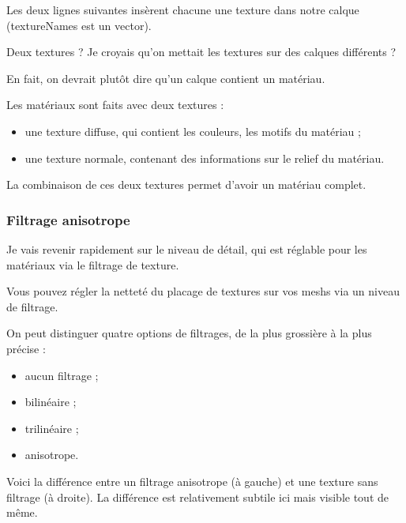 \documentclass[10pt,a4paper]{report}
\begin{document}
Les deux lignes suivantes ins\`erent chacune une texture dans notre calque (textureNames est un vector).

Deux textures ? Je croyais qu'on mettait les textures sur des calques diff\'erents ?

En fait, on devrait plut\^ot dire qu'un calque contient un mat\'eriau.

Les mat\'eriaux sont faits avec deux textures :

\begin{itemize}
\item une texture diffuse, qui contient les couleurs, les motifs du mat\'eriau ;
\item une texture normale, contenant des informations sur le relief du mat\'eriau.
\end{itemize}
   

La combinaison de ces deux textures permet d'avoir un mat\'eriau complet.



\subsubsection{Filtrage anisotrope}


Je vais revenir rapidement sur le niveau de d\'etail, qui est r\'eglable pour les mat\'eriaux via le filtrage de texture.

Vous pouvez r\'egler la nettet\'e du placage de textures sur vos meshs via un niveau de filtrage.

On peut distinguer quatre options de filtrages, de la plus grossi\`ere \`a la plus pr\'ecise :

\begin{itemize}
\item aucun filtrage ;
\item bilin\'eaire ;
\item trilin\'eaire ;
\item anisotrope.
\end{itemize}


Voici la diff\'erence entre un filtrage anisotrope (\`a gauche) et une texture sans filtrage (\`a droite). La diff\'erence est relativement subtile ici mais visible tout de m\^eme.
\end{document}
